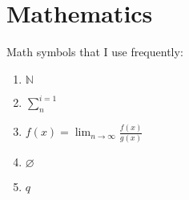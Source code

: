 









\chapter{Mathematics}
\label{chp:Mathematics}




Math symbols that I use frequently: \vspace{-0.3cm}
\begin{enumerate} \itemsep -4pt
\item $\mathbb{N}$
\item $\displaystyle\sum^{i = 1}_{n}$
\item $f(x) = \displaystyle\lim_{n \rightarrow \infty} \frac{f(x)}{g(x)}$
\item $\varnothing$
\item $q$
\end{enumerate}

